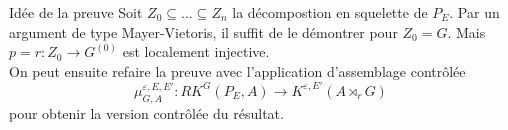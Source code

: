 \begin{frame}{Idée de la preuve}
Soit $Z_0 \subseteq ...\subseteq Z_n$ la décompostion en squelette de $P_E$. Par un argument de type Mayer-Vietoris, il suffit de le démontrer pour $Z_0 = G$. Mais $p =r : Z_0 \rightarrow G^{(0)} $ est localement injective. \\
\vspace{0.3 cm}
On peut ensuite refaire la preuve avec l'application d'assemblage contrôlée
\[\mu_{G,A}^{\varepsilon, E,E'} : RK^G(P_E,A)\rightarrow K^{\varepsilon,E'}(A\rtimes_r G)\]
pour obtenir la version contrôlée du résultat.
\end{frame}

